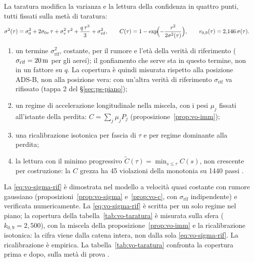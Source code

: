 La taratura modifica la varianza e la lettura della confidenza in quattro punti, tutti fissati sulla metà di taratura:
\begin{equation}\label{eq:vo-sigma-rif}
\sigma^2(\tau)=\sigma_0^2+2\sigma_{0v}\,\tau+\sigma_v^2\,\tau^2+\frac{q\,\tau^3}{3}+\sigma_{\mathrm{rif}}^2,\qquad C(\tau)=1-\exp\!\Bigl(-\frac{r^2}{2\sigma^2(\tau)}\Bigr),\qquad r_{0,9}(\tau)=2{,}146\,\sigma(\tau).
\end{equation}
\begin{enumerate}[label=\arabic*.]
\item un termine $\sigma_{\mathrm{rif}}^2$, costante, per il rumore e l'età della verità di riferimento ($\sigma_{\mathrm{rif}}=20\,\mathrm{m}$ per gli aerei); il gonfiamento che serve sta in questo termine, non in un fattore su $q$. La copertura è quindi misurata rispetto alla posizione ADS-B, non alla posizione vera: con un'altra verità di riferimento $\sigma_{\mathrm{rif}}$ va rifissato (tappa 2 del \S\ref{sec:ps-piano});
\item un regime di accelerazione longitudinale nella miscela, con i pesi $\mu_j$ fissati all'istante della perdita: $C=\sum_j\mu_jP_j$ (proposizione~\ref{prop:vo-imm});
\item una ricalibrazione isotonica per fascia di $\tau$ e per regime dominante alla perdita;
\item la lettura con il minimo progressivo $\tilde C(\tau)=\min_{s\le\tau}C(s)$, non crescente per costruzione: la $C$ grezza ha 45 violazioni della monotonia su 1440 passi .
\end{enumerate}
La \eqref{eq:vo-sigma-rif} è dimostrata nel modello a velocità quasi costante con rumore gaussiano (proposizioni~\ref{prop:vo-sigma} e~\ref{prop:vo-c}, con $\sigma_{\mathrm{rif}}$ indipendente) e verificata numericamente. La \eqref{eq:vo-sigma-rif} è scritta per un solo regime nel piano; la copertura della tabella~\ref{tab:vo-taratura} è misurata sulla sfera ($k_{0,9}=2{,}500$), con la miscela della proposizione~\ref{prop:vo-imm} e la ricalibrazione isotonica: la cifra viene dalla catena intera, non dalla sola \eqref{eq:vo-sigma-rif}. La ricalibrazione è empirica. La tabella~\ref{tab:vo-taratura} confronta la copertura prima e dopo, sulla metà di prova .

